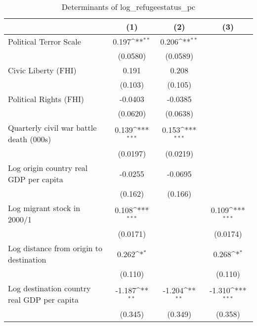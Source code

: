 \begin{table}[htbp]\centering
\def\sym#1{\ifmmode^{#1}\else\(^{#1}\)\fi}
\caption{Determinants of log\_refugeestatus\_pc}
\begin{tabular}{l*{3}{c}}
\hline\hline
                    &\multicolumn{1}{c}{(1)}         &\multicolumn{1}{c}{(2)}         &\multicolumn{1}{c}{(3)}         \\
\hline
Political Terror Scale&       0.197\sym{**} &       0.206\sym{**} &                     \\
                    &    (0.0580)         &    (0.0589)         &                     \\
[1em]
Civic Liberty (FHI) &       0.191         &       0.208         &                     \\
                    &     (0.103)         &     (0.105)         &                     \\
[1em]
Political Rights (FHI)&     -0.0403         &     -0.0385         &                     \\
                    &    (0.0620)         &    (0.0638)         &                     \\
[1em]
Quarterly civil war battle death (000s)&       0.139\sym{***}&       0.153\sym{***}&                     \\
                    &    (0.0197)         &    (0.0219)         &                     \\
[1em]
Log origin country real GDP per capita&     -0.0255         &     -0.0695         &                     \\
                    &     (0.162)         &     (0.166)         &                     \\
[1em]
Log migrant stock in 2000/1&       0.108\sym{***}&                     &       0.109\sym{***}\\
                    &    (0.0171)         &                     &    (0.0174)         \\
[1em]
Log distance from origin to destination&       0.262\sym{*}  &                     &       0.268\sym{*}  \\
                    &     (0.110)         &                     &     (0.110)         \\
[1em]
Log destination country real GDP per capita&      -1.187\sym{**} &      -1.204\sym{**} &      -1.310\sym{***}\\
                    &     (0.345)         &     (0.349)         &     (0.358)         \\

\end{tabular}
\end{table}
